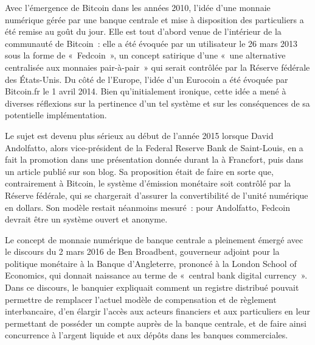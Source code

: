 Avec l'émergence de Bitcoin dans les années 2010, l'idée d'une monnaie numérique gérée par une banque centrale et mise à disposition des particuliers a été remise au goût du jour. Elle est tout d'abord venue de l'intérieur de la communauté de Bitcoin~: elle a été évoquée par un utilisateur le 26 mars 2013 sous la forme de «~Fedcoin~», un concept satirique d'une «~une alternative centralisée aux monnaies pair-à-pair~» qui serait contrôlée par la Réserve fédérale des États-Unis. Du côté de l'Europe, l'idée d'un Eurocoin a été évoquée par Bitcoin.fr le 1\ier{} avril 2014. Bien qu'initialement ironique, cette idée a mené à diverses réflexions sur la pertinence d'un tel système et sur les conséquences de sa potentielle implémentation.

Le sujet est devenu plus sérieux au début de l'année 2015 lorsque David Andolfatto, alors vice-président de la Federal Reserve Bank de Saint-Louis, en a fait la promotion dans une présentation donnée durant la  à Francfort, puis dans un article publié sur son blog. Sa proposition était de faire en sorte que, contrairement à Bitcoin, le système d'émission monétaire soit contrôlé par la Réserve fédérale, qui se chargerait d'assurer la convertibilité de l'unité numérique en dollars. Son modèle restait néanmoins mesuré~: pour Andolfatto, Fedcoin devrait être un système ouvert et anonyme.

Le concept de monnaie numérique de banque centrale a pleinement émergé avec le discours du 2 mars 2016 de Ben Broadbent, gouverneur adjoint pour la politique monétaire à la Banque d'Angleterre, prononcé à la London School of Economics, qui donnait naissance au terme de «~central bank digital currency~». Dans ce discours, le banquier expliquait comment un registre distribué pouvait permettre de remplacer l'actuel modèle de compensation et de règlement interbancaire, d'en élargir l'accès aux acteurs financiers et aux particuliers en leur permettant de posséder un compte auprès de la banque centrale, et de faire ainsi concurrence à l'argent liquide et aux dépôts dans les banques commerciales.

